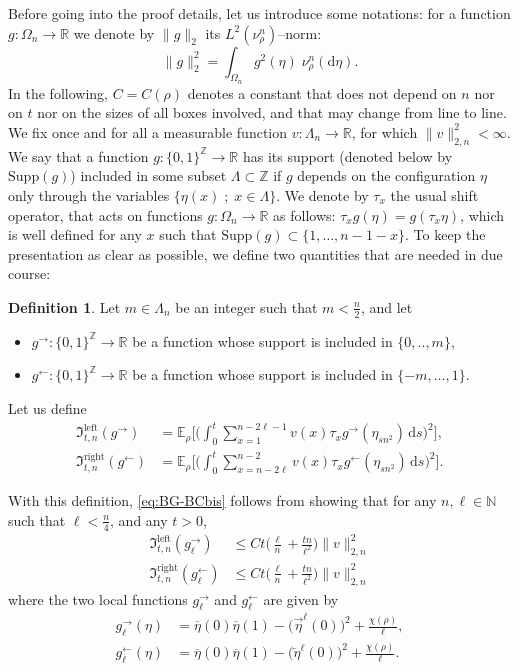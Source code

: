 \documentclass[10pt]{amsart}
\theoremstyle{definition}\newtheorem{defi}[theo]{Definition}\newtheorem{rema}[theo]{Remark}\newtheorem{exam}[theo]{Example}\newtheorem{exem}[theo]{Example}\newtheorem{nota}[theo]{Notation}
\newcommand{\bb}[1]{{\mathbb #1}}
\renewcommand\vec[1]{\overrightarrow{#1}}
\newcommand\vecleft[1]{\overleftarrow{#1}}
\renewcommand{\bar}{\overline}
\renewcommand{\leq}{\leqslant}
\newcommand*{\dd}{\mathrm{d}}
\newcommand*{\ds}{\dd s}
\begin{document}
Before going into the proof details, let us introduce some notations: for a function $g:\Omega_n\to\bb R$ we denote by $\|g\|_2$ its $ L^2(\nu^n_\rho)$--norm:
\[
\|g\|_2^2=\int_{\Omega_n} g^2(\eta) \; \nu^n_\rho(\dd\eta).
\]
In the following, $C=C(\rho)$ denotes a constant that does not depend on $n$ nor on $t$ nor on the sizes of all boxes involved, and that may change from line to line. We fix once and for all a measurable function $v:\Lambda_n\to\bb R$, for which $\|v\|_{2,n}^2<\infty$. We say that a function $g:\{0,1 \}^{\bb Z} \to \bb R$ has its support (denoted below by $ \mathrm{Supp}(g)$) included in some subset $\Lambda \subset \bb Z$ if $g$ depends on the configuration $\eta$ only through the variables $\{\eta(x) \; ; \; x \in \Lambda\}$. We denote by $\tau_x$ the usual shift operator, that acts on functions $g:\Omega_n\to\bb R$ as follows: $\tau_xg(\eta)=g(\tau_x\eta)$, which is well defined for any $x$ such that $\mathrm{Supp}(g) \subset \{1,\dots,n-1-x\}$. To keep the presentation as clear as possible, we define two quantities that are needed in due course:

\begin{defi}
Let $m\in\Lambda_n$ be an integer such that $m <\frac n 2$, and let
\begin{itemize}
\item $g^\rightarrow:\{0,1\}^{\bb Z}\to\bb R$ be a function whose support is included in $\{0,..,m\}$,
\item $g^\leftarrow:\{0,1\}^{\bb Z}\to\bb R$ be a function whose support is included in $\{-m,\dots,1\}$.
\end{itemize}
Let us define
\begin{align*}
\mathfrak{I}^{\mathrm{left}}_{t,n}(g^\rightarrow)&=\bb E_\rho\bigg[\bigg(\int_0^t \sum_{x=1}^{n-2\ell-1} v(x) \tau_xg^\rightarrow(\eta_{sn^2}) \,\ds\bigg)^2\bigg],\\
\mathfrak{I}^{\mathrm{right}}_{t,n}(g^\leftarrow)&=\bb E_\rho\bigg[\bigg(\int_0^t \sum_{x=n-2\ell}^{n-2} v(x) \tau_xg^\leftarrow(\eta_{sn^2}) \,\ds\bigg)^2\bigg].
\end{align*}
\end{defi}

With this definition, \eqref{eq:BG-BCbis} follows from showing that for any $n,\ell \in \bb N$ such that $\ell <\frac n 4$, and any $t>0$,
\begin{align}
\mathfrak{I}^{\mathrm{left}}_{t,n}(g_\ell^\rightarrow)&\leq Ct\bigg(\frac{\ell}{n}+\frac{tn}{\ell^2}\bigg) \|v\|_{2,n}^2 \label{eq:Ileft}
\\
\mathfrak{I}^{\mathrm{right}}_{t,n}(g_\ell^\leftarrow)& \leq Ct\bigg(\frac{\ell}{n}+\frac{tn}{\ell^2}\bigg)\|v\|_{2,n}^2 \label{eq:Iright}
\end{align}
where the two local functions $g_\ell^\rightarrow$ and $g_\ell^\leftarrow$ are given by
\begin{align}
g_\ell^\rightarrow(\eta)&=\bar\eta(0)\bar\eta(1) - \big(\vec\eta^\ell(0)\big)^2 + \frac{\chi(\rho)}{\ell}, \label{eq:psileft}
\\
g_\ell^\leftarrow(\eta)&=\bar\eta(0)\bar\eta(1) - \big(\vecleft\eta^\ell(0)\big)^2 + \frac{\chi(\rho)}{\ell}. \label{eq:psiright}
\end{align}
\end{document}
